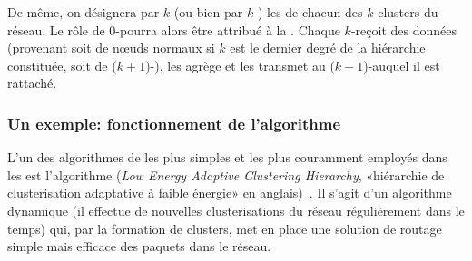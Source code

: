 De même, on désignera par $k$-\ch (ou bien par $k$-\CH) les \chs de chacun des $k$-clusters du réseau.
Le rôle de $0$-\CH pourra alors être attribué à la \sdb.
Chaque $k$-\CH reçoit des données (provenant soit de nœuds normaux si $k$ est le dernier degré de la hiérarchie constituée, soit de ($k+1$)-\CH), les agrège et les transmet au ($k-1$)-\CH auquel il est rattaché.

        \subsubsection{Un exemple: fonctionnement de l'algorithme \leach}\label{st:subsubsec:leach}
L'un des algorithmes de  les plus simples et les plus couramment employés dans les \rcsfs est l'algorithme \leach (\textit{Low Energy Adaptive Clustering Hierarchy}, \cad «hiérarchie de clusterisation adaptative à faible énergie» en anglais)~\cite{HCB00}.
Il s'agit d'un algorithme dynamique (il effectue de nouvelles clusterisations du réseau régulièrement dans le temps) qui, par la formation de clusters, met en place une solution de routage simple mais efficace des paquets dans le réseau.

